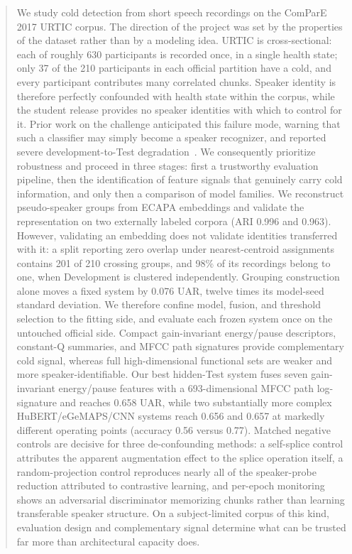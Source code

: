 \begin{abstract}
We study cold detection from short speech recordings on the ComParE 2017 URTIC
corpus. The direction of the project was set by the properties of the dataset
rather than by a modeling idea. URTIC is cross-sectional: each of roughly 630
participants is recorded once, in a single health state; only 37 of the 210
participants in each official partition have a cold, and every participant
contributes many correlated chunks. Speaker identity is therefore perfectly
confounded with health state within the corpus, while the student release
provides no speaker identities with which to control for it. Prior work on the
challenge anticipated this failure mode, warning that such a classifier may
simply become a speaker recognizer, and reported severe development-to-Test
degradation~\cite{huckvale2017cold}. We consequently prioritize robustness and
proceed in three stages: first a trustworthy evaluation pipeline, then the
identification of feature signals that genuinely carry cold information, and
only then a comparison of model families.
We reconstruct pseudo-speaker groups from ECAPA embeddings and validate the
representation on two externally labeled corpora (ARI 0.996 and 0.963).
However, validating an embedding does not validate identities transferred with
it: a split reporting zero overlap under nearest-centroid assignments contains
201 of 210 crossing groups, and 98\% of its recordings belong to one, when
Development is clustered independently. Grouping construction alone moves a
fixed system by 0.076 UAR, twelve times its model-seed standard deviation. We
therefore confine model, fusion, and threshold selection to the fitting side,
and evaluate each frozen system once on the untouched official side.
Compact gain-invariant energy/pause descriptors, constant-Q summaries, and MFCC
path signatures provide complementary cold signal, whereas full
high-dimensional functional sets are weaker and more speaker-identifiable. Our
best hidden-Test system fuses seven gain-invariant energy/pause features with a
693-dimensional MFCC path log-signature and reaches 0.658 UAR, while two
substantially more complex HuBERT/eGeMAPS/CNN systems reach 0.656 and 0.657 at
markedly different operating points (accuracy 0.56 versus 0.77). Matched
negative controls are decisive for three de-confounding methods: a self-splice
control attributes the apparent augmentation effect to the splice operation
itself, a random-projection control reproduces nearly all of the speaker-probe
reduction attributed to contrastive learning, and per-epoch monitoring shows an
adversarial discriminator memorizing chunks rather than learning transferable
speaker structure. On a subject-limited corpus of this kind, evaluation design
and complementary signal determine what can be trusted far more than
architectural capacity does.
\end{abstract}
